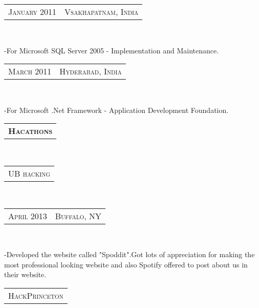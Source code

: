 \documentclass[10pt,a4paper,oneside]{article}
\begin{document}
    \vspace{2pt}
    \textcolor{light-gray}{
        \begin{tabular}{c|c}
            {\small J\textsc{anuary 2011}}
            &{\small V\textsc{sakhapatnam}, I\textsc{ndia}}
        \end{tabular}
    }\\
    \vspace{-12pt}
    \begin{adjustwidth}{7pt}{0pt}
        {\footnotesize -For Microsoft SQL Server 2005 - Implementation and Maintenance.}\\
    \end{adjustwidth}
    \vspace{-6pt} 
    \textcolor{light-gray}{
        \begin{tabular}{c|c}
            {\small M\textsc{arch 2011}}
            &{\small H\textsc{yderabad}, I\textsc{ndia}}
        \end{tabular}
    }\\
    \vspace{-12pt}
    \begin{adjustwidth}{7pt}{0pt}
    {\footnotesize -For Microsoft .Net Framework - Application Development Foundation.}\\
    \end{adjustwidth}
    \begin{tabular}{c}
        \textbf{\normalsize H\textsc{acathons}}
    \end{tabular}\\
    \begin{tabular}{c}
        {\small UB\textsc{ hacking}}
    \end{tabular}\\
    \textcolor{light-gray}{
        \begin{tabular}{c|c}
            {\small A\textsc{pril 2013}}
            &{\small B\textsc{uffalo}, NY}
        \end{tabular}
    }\\
    \vspace{-12pt}
    \begin{adjustwidth}{7pt}{0pt}
        {\footnotesize  -Developed the website called "Spoddit".Got lots of appreciation for 
        making the most professional looking website and also Spotify offered to post
        about us in their website.}\\
    \end{adjustwidth}
    \vspace{-6pt}
    \begin{tabular}{c}
        {\small H\textsc{ack}P\textsc{rinceton}}
    \end{tabular}\\
\end{document}
